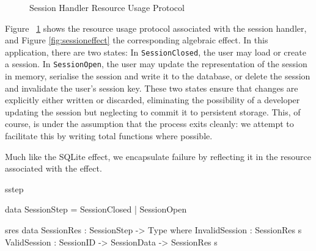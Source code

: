 \begin{figure}[htpb!]
\centering
{}
\caption{Session Handler Resource Usage Protocol}
\label{fig:sessionstates}
\end{figure}

Figure ~\ref{fig:sessionstates} shows the resource usage protocol associated
with the session handler, and Figure \ref{fig:sessioneffect} the corresponding
algebraic effect. In this application, there are two states:
In \texttt{SessionClosed}, the user may load or create a
session.
In \texttt{SessionOpen}, the user may update the
representation of the session in memory, serialise the session and write it to
the database, or delete the session and invalidate the user's session key. 
These two states ensure that changes are explicitly either
written or discarded, eliminating the possibility of a developer updating the
session but neglecting to commit it to persistent storage. This, of course, is
under the assumption that the process exits cleanly: we attempt to facilitate
this by writing total functions where possible.

Much like the SQLite effect, we encapsulate failure by reflecting it in the
resource associated with the effect. 

\begin{SaveVerbatim}{sstep}

data SessionStep = SessionClosed | SessionOpen
\end{SaveVerbatim}

\begin{SaveVerbatim}{sres}
data SessionRes : SessionStep -> Type where
  InvalidSession : SessionRes s  
  ValidSession   : SessionID -> 
                   SessionData -> 
                   SessionRes s

\end{SaveVerbatim}

